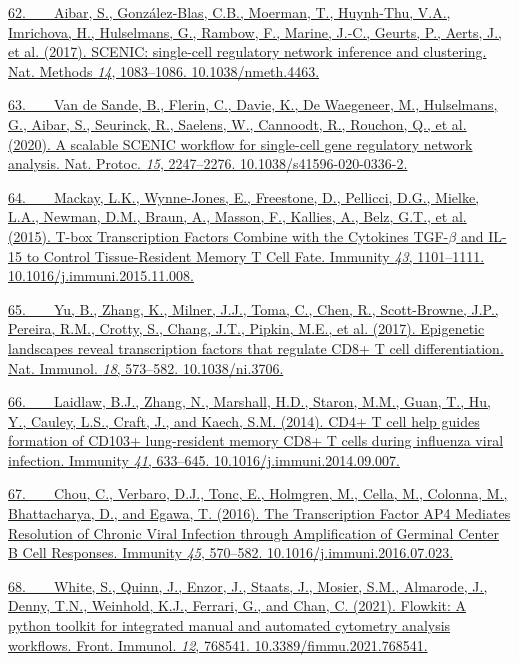 \href{https://sciwheel.com/work/bibliography/4362786}{62.~  Aibar, S.,
González-Blas, C.B., Moerman, T., Huynh-Thu, V.A., Imrichova, H.,
Hulselmans, G., Rambow, F., Marine, J.-C., Geurts, P., Aerts, J., et al.
(2017). SCENIC: single-cell regulatory network inference and clustering.
Nat. Methods \emph{14}, 1083--1086. 10.1038/nmeth.4463.}

\href{https://sciwheel.com/work/bibliography/9127757}{63.~  Van de
Sande, B., Flerin, C., Davie, K., De Waegeneer, M., Hulselmans, G.,
Aibar, S., Seurinck, R., Saelens, W., Cannoodt, R., Rouchon, Q., et al.
(2020). A scalable SCENIC workflow for single-cell gene regulatory
network analysis. Nat. Protoc. \emph{15}, 2247--2276.
10.1038/s41596-020-0336-2.}

\href{https://sciwheel.com/work/bibliography/1306176}{64.~  Mackay,
L.K., Wynne-Jones, E., Freestone, D., Pellicci, D.G., Mielke, L.A.,
Newman, D.M., Braun, A., Masson, F., Kallies, A., Belz, G.T., et al.
(2015). T-box Transcription Factors Combine with the Cytokines TGF-$\beta$ and
IL-15 to Control Tissue-Resident Memory T Cell Fate. Immunity \emph{43},
1101--1111. 10.1016/j.immuni.2015.11.008.}

\href{https://sciwheel.com/work/bibliography/3583222}{65.~  Yu, B.,
Zhang, K., Milner, J.J., Toma, C., Chen, R., Scott-Browne, J.P.,
Pereira, R.M., Crotty, S., Chang, J.T., Pipkin, M.E., et al. (2017).
Epigenetic landscapes reveal transcription factors that regulate CD8+ T
cell differentiation. Nat. Immunol. \emph{18}, 573--582.
10.1038/ni.3706.}

\href{https://sciwheel.com/work/bibliography/1168744}{66.~  Laidlaw,
B.J., Zhang, N., Marshall, H.D., Staron, M.M., Guan, T., Hu, Y., Cauley,
L.S., Craft, J., and Kaech, S.M. (2014). CD4+ T cell help guides
formation of CD103+ lung-resident memory CD8+ T cells during influenza
viral infection. Immunity \emph{41}, 633--645.
10.1016/j.immuni.2014.09.007.}

\href{https://sciwheel.com/work/bibliography/5308382}{67.~  Chou, C.,
Verbaro, D.J., Tonc, E., Holmgren, M., Cella, M., Colonna, M.,
Bhattacharya, D., and Egawa, T. (2016). The Transcription Factor AP4
Mediates Resolution of Chronic Viral Infection through Amplification of
Germinal Center B Cell Responses. Immunity \emph{45}, 570--582.
10.1016/j.immuni.2016.07.023.}

\href{https://sciwheel.com/work/bibliography/13326827}{68.~  White, S.,
Quinn, J., Enzor, J., Staats, J., Mosier, S.M., Almarode, J., Denny,
T.N., Weinhold, K.J., Ferrari, G., and Chan, C. (2021). Flowkit: A
python toolkit for integrated manual and automated cytometry analysis
workflows. Front. Immunol. \emph{12}, 768541.
10.3389/fimmu.2021.768541.}

